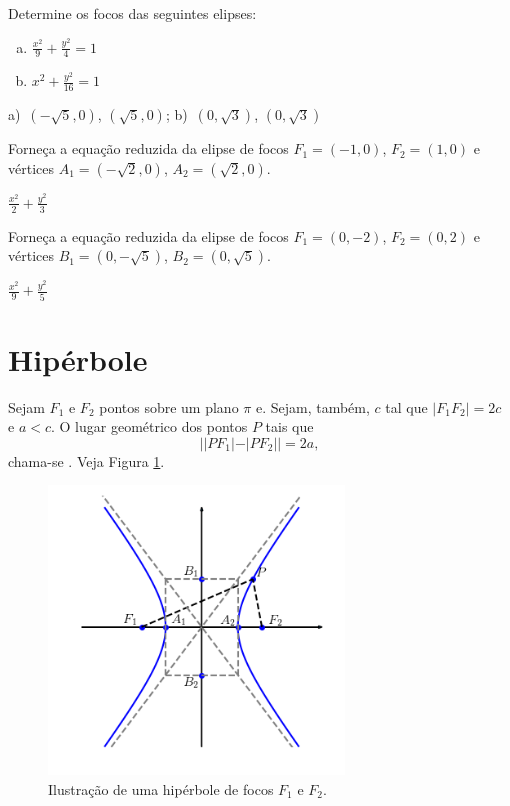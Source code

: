 \begin{exer}
  Determine os focos das seguintes elipses:
  \begin{enumerate}[a)]
  \item $\displaystyle \frac{x^2}{9} + \frac{y^2}{4} = 1$
  \item $\displaystyle x^2 + \frac{y^2}{16} = 1$
  \end{enumerate}
\end{exer}
\begin{resp}
  a)~$(-\sqrt{5}, 0)$, $(\sqrt{5}, 0)$; b)~$(0, \sqrt{3})$, $(0, \sqrt{3})$
\end{resp}

\begin{exer}
  Forneça a equação reduzida da elipse de focos $F_1=(-1, 0)$, $F_2=(1, 0)$ e vértices $A_1=(-\sqrt{2}, 0)$, $A_2=(\sqrt{2}, 0)$.
\end{exer}
\begin{resp}
  $\displaystyle\frac{x^2}{2}+\frac{y^2}{3}$
\end{resp}

\begin{exer}
  Forneça a equação reduzida da elipse de focos $F_1=(0, -2)$, $F_2=(0, 2)$ e vértices $B_1=(0, -\sqrt{5})$, $B_2=(0, \sqrt{5})$.
\end{exer}
\begin{resp}
  $\displaystyle\frac{x^2}{9}+\frac{y^2}{5}$
\end{resp}

\section{Hipérbole}\label{cap_conicas_sec_hiperbole}

Sejam $F_1$ e $F_2$ pontos sobre um plano $\pi$ e. Sejam, também, $c$ tal que $|F_1F_2|=2c$ e $a<c$. O lugar geométrico dos pontos $P$ tais que
\begin{equation}
  ||PF_1|-|PF_2||=2a,
\end{equation}
chama-se . Veja Figura \ref{fig:hiperbole}.

\begin{figure}[H]
  \centering
  \includegraphics[width=0.7\textwidth]{./cap_conicas/dados/fig_hiperbole/fig_hiperbole}
  \caption{Ilustração de uma hipérbole de focos $F_1$ e $F_2$.}
  \label{fig:hiperbole}
\end{figure}

